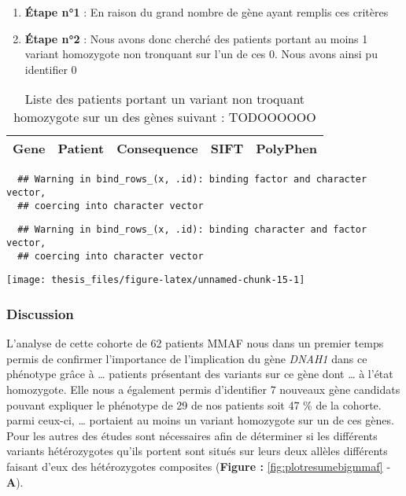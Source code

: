\documentclass[12pt,twoside]{reedthesis}
\providecommand{\tightlist}{%
  \setlength{\itemsep}{0pt}\setlength{\parskip}{0pt}}
\theoremstyle{definition}
\theoremstyle{definition}
\theoremstyle{remark}
\begin{document}
  \begin{enumerate}
  \def\labelenumi{\arabic{enumi}.}
  \tightlist
  \item
    \textbf{Étape n°1} : En raison du grand nombre de gène ayant remplis
    ces critères\\
  \item
    \textbf{Étape n°2} : Nous avons donc cherché des patients portant au
    moins 1 variant homozygote non tronquant sur l'un de ces 0. Nous avons
    ainsi pu identifier 0
  \end{enumerate}
  
  \newpage
  
  \begin{longtable}[t]{lllll}
  \caption{\label{tab:tabgrp4moderate}Liste des patients portant un variant non troquant homozygote sur un des gènes suivant : TODOOOOOO}\\
  \toprule
  Gene & Patient & Consequence & SIFT & PolyPhen\\
  
  
  \bottomrule
  \end{longtable}
  
  \begin{verbatim}
  ## Warning in bind_rows_(x, .id): binding factor and character vector,
  ## coercing into character vector
  \end{verbatim}
  
  \begin{verbatim}
  ## Warning in bind_rows_(x, .id): binding character and factor vector,
  ## coercing into character vector
  \end{verbatim}
  
  \begin{center}\texttt{[image: thesis\_files/figure-latex/unnamed-chunk-15-1]} \end{center}
  
  \newpage
  
  \newpage
  
  \subsubsection{Discussion}\label{discussion-1}
  
  L'analyse de cette cohorte de 62 patients MMAF nous dans un premier
  temps permis de confirmer l'importance de l'implication du gène
  \emph{DNAH1} dans ce phénotype grâce à \ldots{} patients présentant des
  variants sur ce gène dont \ldots{} à l'état homozygote. Elle nous a
  également permis d'identifier 7 nouveaux gène candidats pouvant
  expliquer le phénotype de 29 de nos patients soit 47 \% de la cohorte.
  parmi ceux-ci, \ldots{} portaient au moins un variant homozygote sur un
  de ces gènes. Pour les autres des études sont nécessaires afin de
  déterminer si les différents variants hétérozygotes qu'ils portent sont
  situés sur leurs deux allèles différents faisant d'eux des hétérozygotes
  composites (\textbf{Figure : }\ref{fig:plotresumebigmmaf} - \textbf{A}).
  
\end{document}
